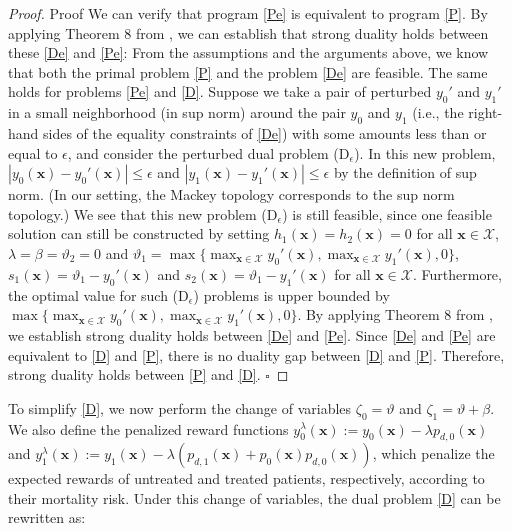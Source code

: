 \documentclass[12pt,a4paper]{article}
\newcommand{\bx}{\mathbf{x}}
\begin{document}
\begin{proof}{Proof}
	We can verify that program \eqref{Pe} is equivalent to program \eqref{P}. By applying Theorem 8 from \cite{anderson1983review}, we can establish that strong duality holds between these \eqref{De} and \eqref{Pe}: 
	From the assumptions and the arguments above, we know that both the primal problem \eqref{P} and the problem \eqref{De} are feasible. The same holds for problems \eqref{Pe} and \eqref{D}. 
	Suppose we take a pair of perturbed $y_0'$ and $y_1'$ in a small neighborhood (in sup norm) around the pair $y_0$ and $y_1$ (i.e., the right-hand sides of the equality constraints of \eqref{De}) with some amounts less than or equal to $\epsilon$, and consider the perturbed dual problem (D$_{\epsilon}$). In this new problem, $|y_0(\bx)-y_0'(\bx)|\leq \epsilon$ and $|y_1(\bx)-y_1'(\bx)|\leq \epsilon$ by the definition of sup norm. (In our setting, the Mackey topology corresponds to the sup norm topology.) We see that this new problem (D$_{\epsilon}$) is still feasible, since one feasible solution can still be constructed by setting $h_1(\bx)=h_2(\bx)=0$ for all $\bx\in \mathcal{X}$, $\lambda=\beta=\vartheta_2=0$ and $\vartheta_1=\max\{\max_{\bx\in \mathcal{X}} y_0'(\bx), \max_{\bx\in \mathcal{X}} y_1'(\bx), 0\}$, $s_1(\bx)=\vartheta_1-y_0'(\bx)$ and $s_2(\bx)=\vartheta_1-y_1'(\bx)$ for all $\bx\in \mathcal{X}$. Furthermore, the optimal value for such (D$_{\epsilon}$) problems is upper bounded by $\max\{\max_{\bx\in \mathcal{X}} y_0'(\bx), \max_{\bx\in \mathcal{X}} y_1'(\bx), 0\}$. By applying Theorem 8 from \cite{anderson1983review}, we establish strong duality holds between \eqref{De} and \eqref{Pe}. Since \eqref{De} and \eqref{Pe} are equivalent to \eqref{D} and \eqref{P}, there is no duality gap between \eqref{D} and \eqref{P}. Therefore, strong duality holds between \eqref{P} and \eqref{D}. \hfill $\square$
\end{proof}


To simplify \eqref{D}, we now perform the change of variables $\zeta_0 = \vartheta$ and $\zeta_1 = \vartheta + \beta$. We also define the penalized reward functions $
y_0^\lambda(\bx) := y_0(\bx) - \lambda p_{d, 0}(\bx)$ and $
y_1^\lambda(\bx) := y_1(\bx) - \lambda\left(p_{d, 1}(\bx) + p_0(\bx)p_{d, 0}(\bx)\right)
$, which penalize the expected rewards of untreated and treated patients, respectively, according to their mortality risk. Under this change of variables, the dual problem \eqref{D} can be rewritten as:
\end{document}
